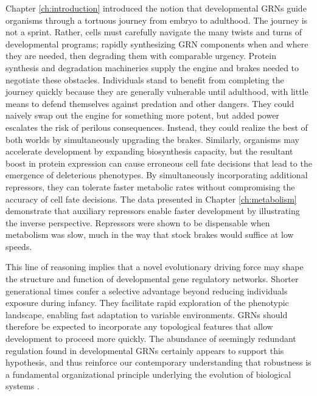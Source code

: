 Chapter \ref{ch:introduction} introduced the notion that developmental GRNs guide organisms through a tortuous journey from embryo to adulthood. The journey is not a sprint. Rather, cells must carefully navigate the many twists and turns of developmental programs; rapidly synthesizing GRN components when and where they are needed, then degrading them with comparable urgency. Protein synthesis and degradation machineries supply the engine and brakes needed to negotiate these obstacles. Individuals stand to benefit from completing the journey quickly because they are generally vulnerable until adulthood, with little means to defend themselves against predation and other dangers. They could naively swap out the engine for something more potent, but added power escalates the risk of perilous consequences. Instead, they could realize the best of both worlds by simultaneously upgrading the brakes. Similarly, organisms may accelerate development by expanding biosynthesis capacity, but the resultant boost in protein expression can cause erroneous cell fate decisions that lead to the emergence of deleterious phenotypes. By simultaneously incorporating additional repressors, they can tolerate faster metabolic rates without compromising the accuracy of cell fate decisions. The data presented in Chapter \ref{ch:metabolism} demonstrate that auxiliary repressors enable faster development by illustrating the inverse perspective. Repressors were shown to be dispensable when metabolism was slow, much in the way that stock brakes would suffice at low speeds. 

This line of reasoning implies that a novel evolutionary driving force may shape the structure and function of developmental gene regulatory networks. Shorter generational times confer a selective advantage beyond reducing individuals exposure during infancy. They facilitate rapid exploration of the phenotypic landscape, enabling fast adaptation to variable environments. GRNs should therefore be expected to incorporate any topological features that allow development to proceed more quickly. The abundance of seemingly redundant regulation found in developmental GRNs certainly appears to support this hypothesis, and thus reinforce our contemporary understanding that robustness is a fundamental organizational principle underlying the evolution of biological systems \cite{Kitano2004,Stelling2004}. 

